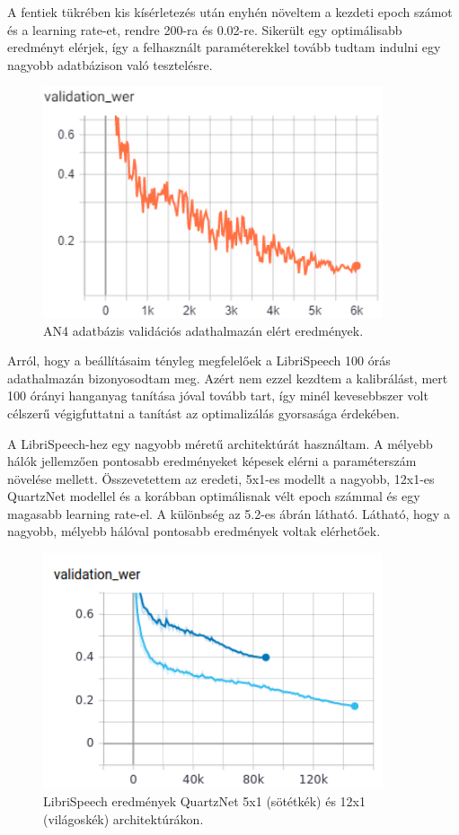 A fentiek tükrében kis kísérletezés után enyhén növeltem a kezdeti epoch számot és a learning rate-et, rendre 200-ra és 0.02-re. Sikerült egy optimálisabb eredményt elérjek, így a felhasznált paraméterekkel tovább tudtam indulni egy nagyobb adatbázison való tesztelésre.

\begin{figure}[!ht]
\centering
\includegraphics[width=100mm, keepaspectratio]{figures/an4_wer.png}
\caption{AN4 adatbázis validációs adathalmazán elért eredmények.}
\end{figure}

Arról, hogy a beállításaim tényleg megfelelőek a LibriSpeech 100 órás adathalmazán bizonyosodtam meg. Azért nem ezzel kezdtem a kalibrálást, mert 100 órányi hanganyag tanítása jóval tovább tart, így minél kevesebbszer volt célszerű végigfuttatni a tanítást az optimalizálás gyorsasága érdekében.

A LibriSpeech-hez egy nagyobb méretű architektúrát használtam. A mélyebb hálók jellemzően pontosabb eredményeket képesek elérni a paraméterszám növelése mellett. Összevetettem az eredeti, 5x1-es modellt a nagyobb, 12x1-es QuartzNet modellel és a korábban optimálisnak vélt epoch számmal és egy magasabb learning rate-el. A különbség az 5.2-es ábrán látható. Látható, hogy a nagyobb, mélyebb hálóval pontosabb eredmények voltak elérhetőek.

\begin{figure}[!ht]
\centering
\includegraphics[width=100mm, keepaspectratio]{figures/architecture_comparrison.png}
\caption{LibriSpeech eredmények QuartzNet 5x1 (sötétkék) és 12x1 (világoskék) architektúrákon.}
\end{figure}


